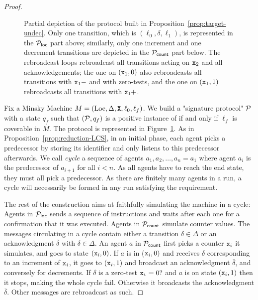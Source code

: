 \begin{proof}
	
	\begin{figure}
			\centering
			\resizebox{.99\linewidth}{!}{
			
			}
			\caption{Partial depiction of the protocol built in Proposition~\ref{prop:target-undec}. Only one transition, which is $(\ell_0, \delta, \ell_1)$, is represented in the $\mathcal{P}_{\mathsf{loc}}$ part above; similarly, only one increment and one decrement transitions are depicted in the $\mathcal{P}_{\mathsf{count}}$ part below. The rebroadcast loops rebroadcast all transitions acting on $\mathtt{x}_2$ and all acknowledgements; the one on $(\mathtt{x}_1,0)$ also rebroadcasts all transitions with $\mathtt{\mathtt{x}_1}-$ and with zero-tests, and the one on $(\mathtt{x}_1,1)$ rebroadcasts all transitions with $\mathtt{\mathtt{x}_1}+$.}
			\label{fig:target-init}
	\end{figure}
	
	Fix a Minsky Machine $M= (\text{Loc}, \Delta, \mathtt{X}, \ell_0, \ell_f)$. We build a "signature protocol" $\mathcal{P}$ with a state $q_f$ such that $(\mathcal{P}, q_f)$ is a positive instance of \TARGET if and only if $\ell_f$ is coverable in $M$. 
	The protocol is represented in Figure~\ref{fig:target-init}. 
	As in Proposition~\ref{prop:reduction-LCS}, in an initial phase, each agent picks a predecessor by storing its identifier and only listens to this predecessor afterwards. We call \emph{cycle} a sequence of agents $a_1, a_2, \ldots, a_n = a_1$ where agent $a_i$ is the predecessor of $a_{i+1}$ for all $i <n$. 
	As all agents have to reach the end state, they must all pick a predecessor.
	As there are finitely many agents in a run, a cycle will necessarily be formed in any run satisfying the \TARGET requirement.
	
	The rest of the construction aims at faithfully simulating the machine in a cycle: Agents in $\mathcal{P}_{\mathsf{loc}}$ sends a sequence of instructions and waits after each one for a confirmation that it was executed. Agents in $\mathcal{P}_{\mathsf{count}}$ simulate counter values. The messages circulating in a cycle contain either a transition $\delta \in \Delta$ or an acknowledgment $\overline{\delta}$ with $\delta \in \Delta$. 
	An agent $a$ in $\mathcal{P}_{\mathsf{count}}$ first picks a counter $\mathtt{x}_i$ it simulates, and goes to state $(\mathtt{x}_i,0)$. If $a$ is in ($\mathtt{x}_i,0)$ and receives $\delta$ corresponding to an increment of $\mathtt{x}_i$, it goes to $(\mathtt{x}_i,1)$ and broadcast an acknowledgment $\overline{\delta}$, and conversely for decrements. If $\delta$ is a zero-test $\mathtt{\mathtt{x}_i}=0?$ and $a$ is on state $(\mathtt{x}_i,1)$ then it stops, making the whole cycle fail. Otherwise it broadcasts the acknowledgment $\overline{\delta}$. Other messages are rebroadcast as such. 


\end{proof}
